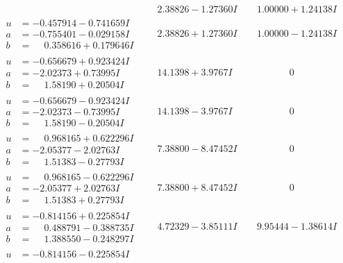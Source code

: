 \documentclass[1p]{elsarticle_modified}
\theoremstyle{definition}
\begin{document}
$$\begin{array}{c|c|c}
 & \phantom{-}2.38826 - 1.27360 I & \phantom{-}1.00000 + 1.24138 I \\ \hline\begin{aligned}
u &= -0.457914 - 0.741659 I \\
a &= -0.755401 - 0.029158 I \\
b &= \phantom{-}0.358616 + 0.179646 I\end{aligned}
 & \phantom{-}2.38826 + 1.27360 I & \phantom{-}1.00000 - 1.24138 I \\ \hline\begin{aligned}
u &= -0.656679 + 0.923424 I \\
a &= -2.02373 + 0.73995 I \\
b &= \phantom{-}1.58190 + 0.20504 I\end{aligned}
 & \phantom{-}14.1398 + 3.9767 I & \phantom{-0.000000 } 0 \\ \hline\begin{aligned}
u &= -0.656679 - 0.923424 I \\
a &= -2.02373 - 0.73995 I \\
b &= \phantom{-}1.58190 - 0.20504 I\end{aligned}
 & \phantom{-}14.1398 - 3.9767 I & \phantom{-0.000000 } 0 \\ \hline\begin{aligned}
u &= \phantom{-}0.968165 + 0.622296 I \\
a &= -2.05377 - 2.02763 I \\
b &= \phantom{-}1.51383 - 0.27793 I\end{aligned}
 & \phantom{-}7.38800 - 8.47452 I & \phantom{-0.000000 } 0 \\ \hline\begin{aligned}
u &= \phantom{-}0.968165 - 0.622296 I \\
a &= -2.05377 + 2.02763 I \\
b &= \phantom{-}1.51383 + 0.27793 I\end{aligned}
 & \phantom{-}7.38800 + 8.47452 I & \phantom{-0.000000 } 0 \\ \hline\begin{aligned}
u &= -0.814156 + 0.225854 I \\
a &= \phantom{-}0.488791 - 0.388735 I \\
b &= \phantom{-}1.388550 - 0.248297 I\end{aligned}
 & \phantom{-}4.72329 - 3.85111 I & \phantom{-}9.95444 - 1.38614 I \\ \hline\begin{aligned}
u &= -0.814156 - 0.225854 I \\

\end{aligned}
\end{array}$$
\end{document}
